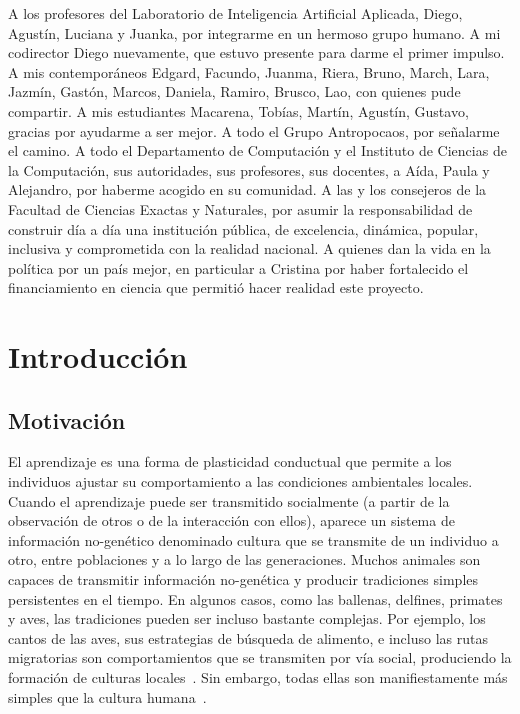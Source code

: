 \documentclass[a4paper,11pt]{book}
\makeatletter
\renewcommand{\mainmatter}{\cleardoublepage\@mainmattertrue}
\theoremstyle{definition}
\makeatother
\begin{document}
%
A los profesores del Laboratorio de Inteligencia Artificial Aplicada, Diego, Agust\'in, Luciana y Juanka, por integrarme en un hermoso grupo humano.
%
A mi codirector Diego nuevamente, que estuvo presente para darme el primer impulso.
%
A mis contempor\'aneos Edgard, Facundo, Juanma, Riera, Bruno, March, Lara, Jazm\'in, Gast\'on, Marcos, Daniela, Ramiro, Brusco, Lao, con quienes pude compartir.
%
A mis estudiantes Macarena, Tob\'ias, Mart\'in, Agust\'in, Gustavo, gracias por ayudarme a ser mejor.
%
A todo el Grupo Antropocaos, por se\~nalarme el camino.
%
A todo el Departamento de Computaci\'on y el Instituto de Ciencias de la Computaci\'on, sus autoridades, sus profesores, sus docentes, a A\'ida, Paula y Alejandro, por haberme acogido en su comunidad.
%
A las y los consejeros de la Facultad de Ciencias Exactas y Naturales, por asumir la responsabilidad de construir d\'ia a d\'ia una instituci\'on p\'ublica, de excelencia, din\'amica, popular, inclusiva y comprometida con la realidad nacional.
%
A quienes dan la vida en la pol\'itica por un pa\'is mejor, en particular a Cristina por haber fortalecido el financiamiento en ciencia que permiti\'o hacer realidad este proyecto.








\mainmatter

\chapter{Introducci\'on} \label{ch_evo}

\section{Motivaci\'on}

El aprendizaje es una forma de plasticidad conductual que permite a los individuos ajustar su comportamiento a las condiciones ambientales locales.
%
Cuando el aprendizaje puede ser transmitido socialmente (a partir de la observaci\'on de otros o de la interacci\'on con ellos), aparece un sistema de informaci\'on no-gen\'etico denominado cultura que se transmite de un individuo a otro, entre poblaciones y a lo largo de las generaciones.
%
Muchos animales son capaces de transmitir informaci\'on no-gen\'etica y producir tradiciones simples persistentes en el tiempo.
%
En algunos casos, como las ballenas, delfines, primates y aves, las tradiciones pueden ser incluso bastante complejas.
%
Por ejemplo, los cantos de las aves, sus estrategias de b\'usqueda de alimento, e incluso las rutas migratorias son comportamientos que se transmiten por v\'ia social, produciendo la formaci\'on de culturas locales~\cite{aplin2022-birdsCulture}.
%
Sin embargo, todas ellas son manifiestamente m\'as simples que la cultura humana~\cite{boyd1996-whyCultureIsCommon}.
\end{document}
